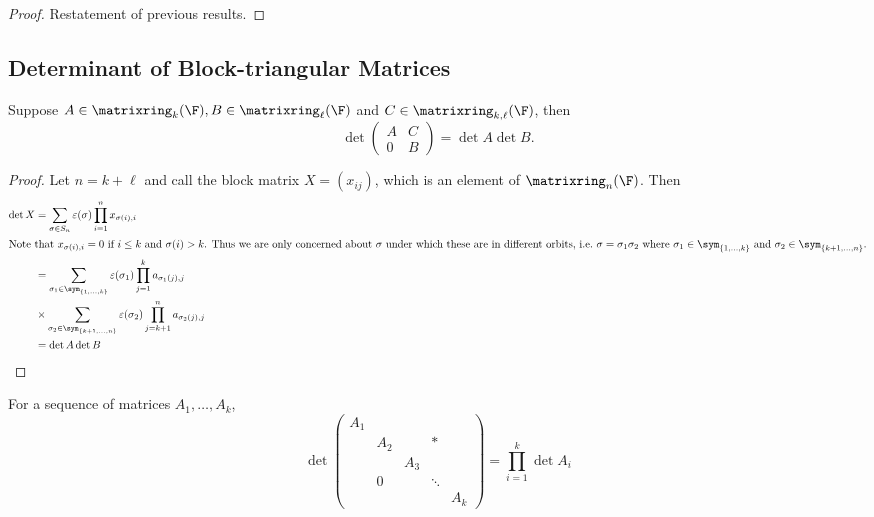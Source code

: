 \documentclass[a4paper]{article}
\newcommand*{\M}{\matrixring}
\theoremstyle{definition}
\begin{document}
\begin{proof}
  Restatement of previous results.
\end{proof}

\subsection{Determinant of Block-triangular Matrices}

\begin{lemma}
  Suppose \(A \in \M_k(\F), B \in \M_\ell(\F)\) and \(C \in \M_{k, \ell}(\F)\), then
  \[
    \det
    \begin{pmatrix}
      A & C \\
      0 & B
    \end{pmatrix}
    = \det A \det B.
  \]
\end{lemma}

\begin{proof}
  Let \(n = k + \ell\) and call the block matrix \(X = (x_{ij})\), which is an element of \(\M_n(\F)\). Then
  \begin{align*}
    \det X &= \sum_{\sigma \in S_n}^{ }\varepsilon(\sigma) \prod_{i = 1}^{n} x_{\sigma(i), i} \\
    \intertext{Note that \(x_{\sigma(i), i} = 0\) if \(i \leq k\) and \(\sigma(i) > k\). Thus we are only concerned about \(\sigma\) under which these are in different orbits, i.e.\ \(\sigma = \sigma_1\sigma_2\) where \(\sigma_1 \in \sym_{\{1,\dots, k\}}\) and \(\sigma_2 \in \sym_{\{k+1, \dots, n\}}\).}
           &= \sum_{\sigma_1 \in \sym_{\{1, \dots, k\}}}^{ } \varepsilon(\sigma_1) \prod_{j = 1}^{k} a_{\sigma_1(j),j} \\
           &\times \sum_{\sigma_2 \in \sym_{\{k+1, \dots, n\}}}^{ } \varepsilon(\sigma_2) \prod_{j = k + 1}^{n} a_{\sigma_2(j),j} \\
           &= \det A \det B
  \end{align*}
\end{proof}

\begin{corollary}
  For a sequence of matrices \(A_1, \dots, A_k\),
  \[
    \det
    \begin{pmatrix}
      A_1 & & & & \\
      & A_2 & & * & \\
      & & A_3 & & \\
      & 0 & & \ddots & \\
      & & & & A_k
    \end{pmatrix}
    = \prod_{i = 1}^{k} \det A_i
  \]
\end{corollary}
\end{document}
